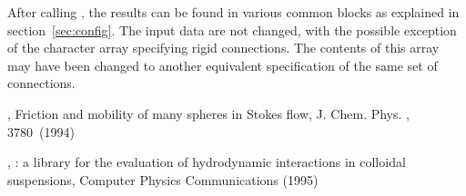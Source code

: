 After calling , the results can be found in various common
blocks as explained in section~\ref{sec:config}. The input data
are not changed, with the possible exception of the character array
specifying rigid connections. The contents of this array may have been
changed to another equivalent specification of the same set of
connections.


\begin{thebibliography}{9}

  ,
  Friction and mobility of many spheres in Stokes flow,
  J. Chem. Phys. , 3780~(1994)

  ,
  : a library for the evaluation of hydrodynamic
       interactions in colloidal suspensions,
  Computer Physics Communications (1995)

\end{thebibliography}


